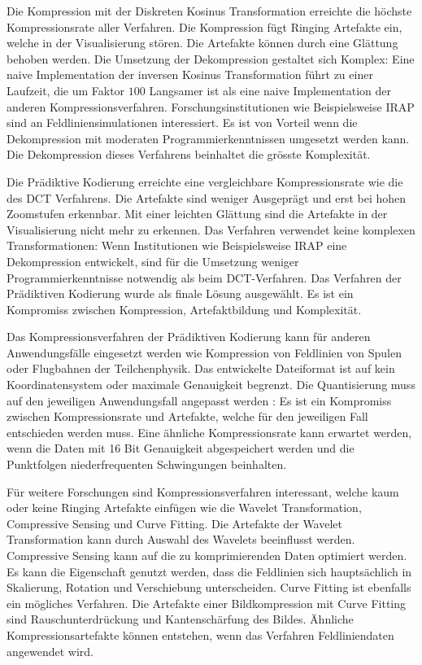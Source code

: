 Die Kompression mit der Diskreten Kosinus Transformation erreichte die höchste Kompressionsrate aller Verfahren. Die Kompression fügt Ringing Artefakte ein, welche in der Visualisierung stören. Die Artefakte können durch eine Glättung behoben werden. Die Umsetzung der Dekompression gestaltet sich Komplex: Eine naive Implementation der inversen Kosinus Transformation führt zu einer Laufzeit, die um Faktor $100$ Langsamer ist als eine naive Implementation der anderen Kompressionsverfahren. Forschungsinstitutionen wie Beispielsweise IRAP \cite{website:irap} sind an Feldliniensimulationen interessiert. Es ist von Vorteil wenn die Dekompression mit moderaten Programmierkenntnissen umgesetzt werden kann. Die Dekompression dieses Verfahrens beinhaltet die grösste Komplexität.

Die Prädiktive Kodierung erreichte eine vergleichbare Kompressionsrate wie die des DCT Verfahrens. Die Artefakte sind weniger Ausgeprägt und erst bei hohen Zoomstufen erkennbar. Mit einer leichten Glättung sind die Artefakte in der Visualisierung nicht mehr zu erkennen. Das Verfahren verwendet keine komplexen Transformationen: Wenn Institutionen wie Beispielsweise IRAP \cite{website:irap} eine Dekompression entwickelt, sind für die Umsetzung weniger Programmierkenntnisse notwendig als beim DCT-Verfahren. Das Verfahren der Prädiktiven Kodierung wurde als finale Lösung ausgewählt. Es ist ein Kompromiss zwischen Kompression, Artefaktbildung und Komplexität.

Das Kompressionsverfahren der Prädiktiven Kodierung kann für anderen Anwendungsfälle eingesetzt werden wie Kompression von Feldlinien von Spulen oder Flugbahnen der Teilchenphysik. Das entwickelte Dateiformat ist auf kein Koordinatensystem oder maximale Genauigkeit begrenzt. Die Quantisierung muss auf den jeweiligen Anwendungsfall angepasst werden : Es ist ein Kompromiss zwischen Kompressionsrate und Artefakte, welche für den jeweiligen Fall entschieden werden muss. Eine ähnliche Kompressionsrate kann erwartet werden, wenn die Daten mit 16 Bit Genauigkeit abgespeichert werden und die Punktfolgen niederfrequenten Schwingungen beinhalten.

Für weitere Forschungen sind Kompressionsverfahren interessant, welche kaum oder keine Ringing Artefakte einfügen wie die Wavelet Transformation, Compressive Sensing und Curve Fitting. Die Artefakte der Wavelet Transformation kann durch Auswahl des Wavelets beeinflusst werden. Compressive Sensing kann auf die zu komprimierenden Daten optimiert werden. Es kann die Eigenschaft genutzt werden, dass die Feldlinien sich hauptsächlich in Skalierung, Rotation und Verschiebung unterscheiden. Curve Fitting ist ebenfalls ein mögliches Verfahren. Die Artefakte einer Bildkompression mit Curve Fitting sind Rauschunterdrückung und Kantenschärfung des Bildes. Ähnliche Kompressionsartefakte können entstehen, wenn das Verfahren Feldliniendaten angewendet wird.


